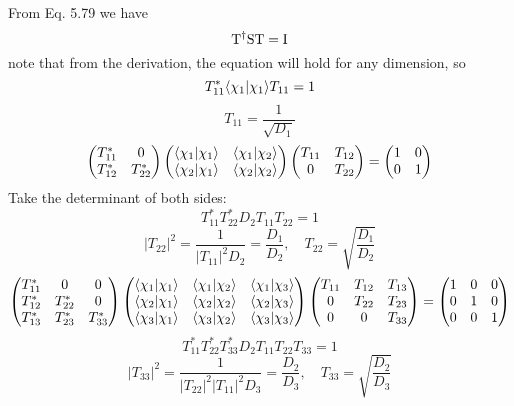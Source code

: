 \documentclass[a4paper]{article}
\begin{document}
From Eq. 5.79 we have
\[
\mathrm{T}^\dagger\mathrm{S}\mathrm{T}=\mathrm{I}
\]
note that from the derivation, the equation will hold for any dimension, so
\[
T_{11}^*\langle\chi_1|\chi_1\rangle T_{11}=1
\]
\[
T_{11}=\frac{1}{\sqrt{D_1}}
\]
\[
\begin{pmatrix}
T_{11}^*&0\\
T_{12}^*&T_{22}^*\\
\end{pmatrix}
\begin{pmatrix}
\langle\chi_1|\chi_1\rangle&\langle\chi_1|\chi_2\rangle\\
\langle\chi_2|\chi_1\rangle&\langle\chi_2|\chi_2\rangle\\
\end{pmatrix}
\begin{pmatrix}
T_{11}&T_{12}\\
0&T_{22}\\
\end{pmatrix}=
\begin{pmatrix}
1&0\\
0&1\\
\end{pmatrix}
\]
Take the determinant of both sides:
\[
T_{11}^*T_{22}^*D_2T_{11}T_{22}=1
\]
\[
|T_{22}|^2=\frac{1}{|T_{11}|^2D_2}=\frac{D_1}{D_2},\quad T_{22}=\sqrt{\frac{D_1}{D_2}}
\]
\[
\begin{pmatrix}
T_{11}^*&0&0\\
T_{12}^*&T_{22}^*&0\\
T_{13}^*&T_{23}^*&T_{33}^*
\end{pmatrix}
\begin{pmatrix}
\langle\chi_1|\chi_1\rangle&\langle\chi_1|\chi_2\rangle&\langle\chi_1|\chi_3\rangle\\
\langle\chi_2|\chi_1\rangle&\langle\chi_2|\chi_2\rangle&\langle\chi_2|\chi_3\rangle\\
\langle\chi_3|\chi_1\rangle&\langle\chi_3|\chi_2\rangle&\langle\chi_3|\chi_3\rangle\\
\end{pmatrix}
\begin{pmatrix}
T_{11}&T_{12}&T_{13}\\
0&T_{22}&T_{23}\\
0&0&T_{33}
\end{pmatrix}=
\begin{pmatrix}
1&0&0\\
0&1&0\\
0&0&1
\end{pmatrix}
\]
\[
T_{11}^*T_{22}^*T_{33}^*D_2T_{11}T_{22}T_{33}=1
\]
\[
|T_{33}|^2=\frac{1}{|T_{22}|^2|T_{11}|^2D_3}=\frac{D_2}{D_3},\quad T_{33}=\sqrt{\frac{D_2}{D_3}}
\]
\end{document}

